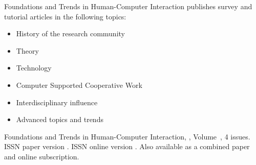 


\journalaimsandscope
 {%
  Foundations and Trends\textsuperscript{\textregistered} in
Human-Computer Interaction publishes
 survey and tutorial articles in the following topics:
 \begin{itemize}
\item{History of the research community}
\item{Theory}
\item{Technology}
\item{Computer Supported Cooperative Work}
\item{Interdisciplinary influence}
\item{Advanced topics and trends}
\end{itemize}
 }


\journallibraryinfo
 {%
  Foundations and Trends\textsuperscript{\textregistered} in
  Human-Computer Interaction, ,
  Volume~, 4 issues.
  ISSN paper version .
  ISSN online version .
  Also available as a combined paper and online
  subscription.
 } 